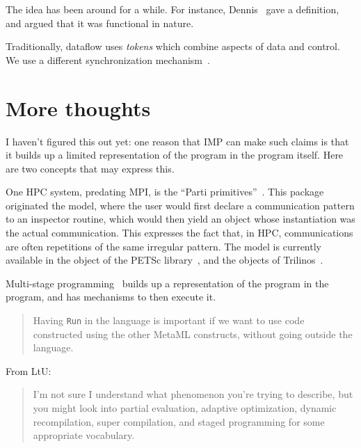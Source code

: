 \documentclass[11pt,fleqn,preprint]{impreport}
\begin{document}
The  idea has been around for a while. For
instance, Dennis~\cite{Dennis:1974:FirstVersion} gave a definition,
and argued that it was functional in nature.

Traditionally, dataflow uses \emph{tokens}
which combine aspects of data and control. We use a different
synchronization mechanism~\cite{IMP-04}.

\section{More thoughts}

I haven't figured this out yet: one reason that \ac{IMP} can make such
claims is that it builds up a limited representation of the program
in the program itself. Here are two concepts that may express this.


One HPC system, predating MPI, is the ``Parti
primitives''~\cite{Sussman92partiprimitives}. This package originated
the  model, where the user would first
declare a communication pattern to an inspector routine, which would
then yield an object whose instantiation was the actual
communication. This expresses the fact that, in \ac{HPC},
communications are often repetitions of the same irregular pattern.
The  model is currently available in the
 object of the PETSc library~\cite{GrSm:petsc}, and the
 objects of Trilinos~\cite{Trilinos}.


Multi-stage programming~\cite{taha1999multi} builds up a representation of
the program in the program, and has mechanisms to then execute it.
\begin{quotation}
  Having \texttt{Run} in the language is important if we want to use
  code constructed using the other MetaML constructs, without going
  outside the language.
\end{quotation}

From LtU:
\begin{quotation}
  I'm not sure I understand what phenomenon you're trying to describe,
  but you might look into partial evaluation, adaptive optimization,
  dynamic recompilation, super compilation, and staged programming for
  some appropriate vocabulary.
\end{quotation}



\end{document}
